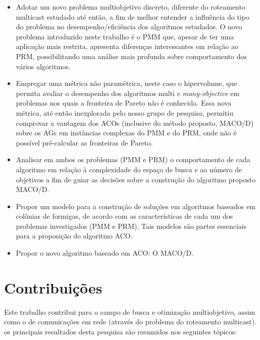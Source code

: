 \begin{itemize}  
	\item Adotar um novo problema multiobjetivo discreto, diferente do roteamento multicast estudado até então, a fim de melhor entender a influência do tipo do problema no desempenho/eficiência dos algoritmos estudados. O novo problema introduzido neste trabalho é o \ac{PMM} que, apesar de ter uma aplicação mais restrita, apresenta diferenças interessantes em relação ao \ac{PRM}, possibilitando uma análise mais profunda sobre comportamento dos vários algoritmos.
	\item Empregar uma métrica não paramétrica, neste caso o hipervolume, que permita avaliar o desempenho dos algoritmos multi e \textit{many-objective} em problemas nos quais a fronteira de Pareto não é conhecida. Essa nova métrica, até então inexplorada pelo nosso grupo de pesquisa, permitiu comprovar a vantagem dos ACOs (inclusive do método proposto, MACO/D) sobre os AGs em instâncias complexas do PMM e do PRM, onde não é possível pré-calcular as fronteiras de Pareto.
	\item Analisar em ambos os problemas (\ac{PMM} e \ac{PRM}) o comportamento de cada algoritmo em relação à complexidade do espaço de busca e ao número de objetivos a fim de guiar as decisões sobre a construção do algoritmo proposto MACO/D. 
	\item Propor um modelo para a construção de soluções em algoritmos baseados em colônias de formigas, de acordo com as características de cada um dos problemas investigados (PMM e PRM). Tais modelos são partes essenciais para a proposição do algoritmo ACO.
	\item Propor o novo algoritmo baseado em \ac{ACO}: O \ac{MACO/D}.
\end{itemize}


\section{Contribuições}
Este trabalho contribui para o campo de busca e otimização multiobjetivo, assim como o de comunicações em rede (através do problema do roteamento multicast). os principais resultados desta pesquisa são resumidos nos seguintes tópicos:

